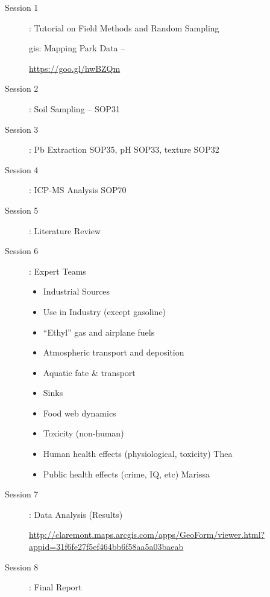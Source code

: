 \documentclass{article}\usepackage[]{graphicx}\usepackage[]{color}
\begin{document}
\begin{description}

\item[Session 1]: Tutorial on Field Methods and Random Sampling


gis: Mapping Park Data -- 

\url{https://goo.gl/hwBZQm}

\item[Session 2]: Soil Sampling -- SOP31

\item[Session 3]: Pb Extraction SOP35, pH SOP33, texture SOP32

\item[Session 4]: ICP-MS Analysis SOP70

\item[Session 5]: Literature Review 

\item[Session 6]: Expert Teams


\begin{itemize}


  \item Industrial Sources
  \item Use in Industry (except gasoline) 
  \item ``Ethyl'' gas and airplane fuels 
  \item Atmospheric transport and deposition
  \item Aquatic fate \& transport 
  \item Sinks 
  \item Food web dynamics 
  \item Toxicity (non-human) 
  \item Human health effects (physiological, toxicity) Thea
  \item Public health effects (crime, IQ, etc) Marissa
\end{itemize}

  \item[Session 7]: Data Analysis (Results)

\url{http://claremont.maps.arcgis.com/apps/GeoForm/viewer.html?appid=31f6fe27f5ef464bb6f58aa5a03baeab}

\item[Session 8]: Final Report

\end{description}
\end{document}
